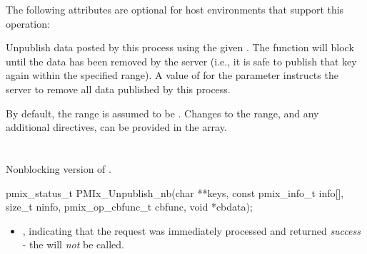 \optattrstart
The following attributes are optional for host environments that support this operation:


\optattrend

\descr

Unpublish data posted by this process using the given .
The function will block until the data has been removed by the server (i.e., it is safe to publish that key again within the specified range).
A value of  for the  parameter instructs the server to remove all data published by this process.

By default, the range is assumed to be .
Changes to the range, and any additional directives, can be provided in the  array.


\section{}

\summary

Nonblocking version of .

\format

\cspecificstart
\begin{codepar}
pmix_status_t
PMIx_Unpublish_nb(char **keys,
                  const pmix_info_t info[], size_t ninfo,
                  pmix_op_cbfunc_t cbfunc, void *cbdata);
\end{codepar}
\cspecificend

\begin{arglist}
\end{arglist}

\returnsimplenb

\begin{itemize}
    \item {}, indicating that the request was immediately processed and returned \textit{success} - the  will \textit{not} be called.
\end{itemize}

